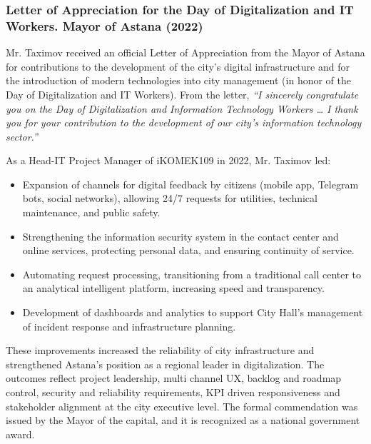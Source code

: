 \subsubsection{Letter of Appreciation for the Day of Digitalization and IT Workers. Mayor of Astana (2022)}

Mr. Taximov received an official Letter of Appreciation from the Mayor of Astana for contributions to the development of the city's digital infrastructure and for the introduction of modern technologies into city management (in honor of the Day of Digitalization and IT Workers). From the letter, \emph{``I sincerely congratulate you on the Day of Digitalization and Information Technology Workers … I thank you for your contribution to the development of our city's information technology sector.''}

As a Head-IT Project Manager of iKOMEK109 in 2022, Mr. Taximov led:

\vspace{-0.5\baselineskip}
\begin{itemize}[nosep]
\item Expansion of channels for digital feedback by citizens (mobile app, Telegram bots, social networks), allowing 24/7 requests for utilities, technical maintenance, and public safety.
\item Strengthening the information security system in the contact center and online services, protecting personal data, and ensuring continuity of service.
\item Automating request processing, transitioning from a traditional call center to an analytical intelligent platform, increasing speed and transparency.
\item Development of dashboards and analytics to support City Hall's management of incident response and infrastructure planning.
\end{itemize}

These improvements increased the reliability of city infrastructure and strengthened Astana's position as a regional leader in digitalization. The outcomes reflect project leadership, multi channel UX, backlog and roadmap control, security and reliability requirements, KPI driven responsiveness and stakeholder alignment at the city executive level. The formal commendation was issued by the Mayor of the capital, and it is recognized as a national government award.
